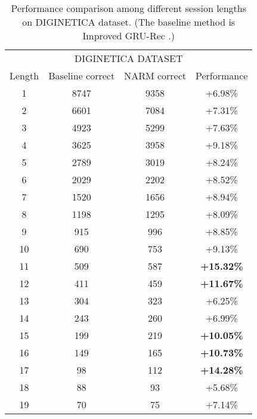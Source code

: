 \documentclass[sigconf]{acmart}
\begin{document}
    \begin{table}[htbp]
  	    \caption{Performance comparison among different session lengths on DIGINETICA dataset. (The baseline method is Improved GRU-Rec \cite{tan2016improved}.)}
  	    \label{tab:lenth comparision}
  	    \begin{tabular}{cccc}
  		    \toprule
  		    \multicolumn{4}{c}{DIGINETICA DATASET}\\
  		
  		    Length & Baseline correct & NARM correct & Performance\\
  		    \midrule
	  		1 & 8747 & 9358 & +6.98\%\\
	  		2 & 6601 & 7084 & +7.31\%\\
	  		3 & 4923 & 5299 & +7.63\%\\
	  		4 & 3625 & 3958 & +9.18\%\\
	  		5 & 2789 & 3019 & +8.24\%\\
	  		6 & 2029 & 2202 & +8.52\%\\
	  		7 & 1520 & 1656 & +8.94\%\\
	  		8 & 1198 & 1295 & +8.09\%\\
	  		9 & 915 & 996 & +8.85\%\\
	  		10 & 690 & 753 & +9.13\%\\
	  		11 & 509 & 587 & \textbf{+15.32\%}\\
	  		12 & 411 & 459 & \textbf{+11.67\%}\\
	  		13 & 304 & 323 & +6.25\%\\
	  		14 & 243 & 260 & +6.99\%\\
	  		15 & 199 & 219 & \textbf{+10.05\%}\\
	  		16 & 149 & 165 & \textbf{+10.73\%}\\
	  		17 & 98 & 112 &\textbf{+14.28\%}\\
	  		18 & 88 & 93 & +5.68\%\\
	  		19 & 70 & 75 & +7.14\%\\
  		    \bottomrule
  	    \end{tabular}
    \end{table}
\end{document}
